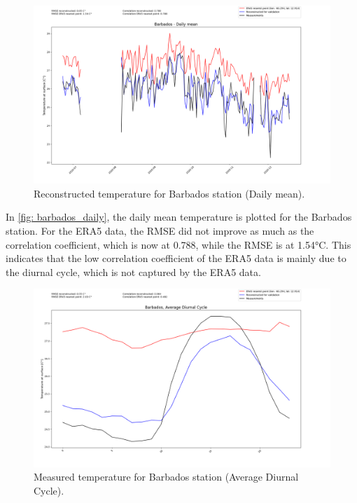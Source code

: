 \begin{figure}
    \centering
    \includegraphics[width=1.00\textwidth]{resources/images/charts/barbados_eval_grib_final/Barbados - Daily mean.png}
    \caption{Reconstructed temperature for Barbados station (Daily mean).}
    \label{fig: barbados_daily}
\end{figure}

In \autoref{fig: barbados_daily}, the daily mean temperature is plotted for the Barbados station. For the ERA5 data, the RMSE did not improve as much as the correlation coefficient, which is now at 0.788, while the RMSE is at 1.54°C. This indicates that the low correlation coefficient of the ERA5 data is mainly due to the diurnal cycle, which is not captured by the ERA5 data. 

\begin{figure}
    \centering
    \includegraphics[width=1.00\textwidth]{resources/images/charts/barbados_eval_grib_final/Barbados, Average Diurnal Cycle.png}
    \caption{Measured temperature for Barbados station (Average Diurnal Cycle).}
    \label{fig: barbados_diurnal}
\end{figure}

